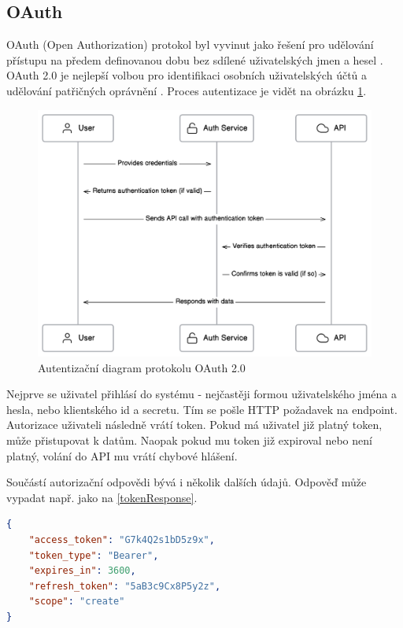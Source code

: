 \documentclass[czech, bc, kiv, he, iso690numb]{fasthesis}
\begin{document}
\subsection{OAuth}
OAuth (Open Authorization) protokol byl vyvinut jako řešení pro udělování přístupu na předem definovanou dobu bez sdílené uživatelských jmen a hesel \cite{understandingOAuth2}. OAuth 2.0
je nejlepší volbou pro identifikaci osobních uživatelských účtů a udělování patřičných oprávnění \cite{mostUsedAuthentication}. Proces autentizace je vidět na obrázku \ref{fig:oauth2Diagram}.


\begin{figure}
	\centering
	\includegraphics[width=1\textwidth]{pictures/oauth2-diagram.png}
	\caption{Autentizační diagram protokolu OAuth 2.0 \cite{oAuthImage}}
	\label{fig:oauth2Diagram}
\end{figure}


Nejprve se uživatel přihlásí do systému - nejčastěji formou uživatelského jména a hesla, nebo klientského id a secretu. Tím se pošle HTTP požadavek na endpoint. Autorizace uživateli následně
vrátí token. Pokud má uživatel již platný token, může přistupovat k datům. Naopak pokud mu token již expiroval nebo není platný, volání do API mu vrátí chybové hlášení. 

Součástí autorizační odpovědi bývá i několik dalších údajů. Odpověď může vypadat např. jako na \ref{tokenResponse}. 

\begin{lstlisting}[language=json, caption={Ukázková odpověď autorizačního serveru}, label=tokenResponse]
{
	"access_token": "G7k4Q2s1bD5z9x",
	"token_type": "Bearer",
	"expires_in": 3600,
	"refresh_token": "5aB3c9Cx8P5y2z",
	"scope": "create"
}
\end{lstlisting}
	  
\end{document}
